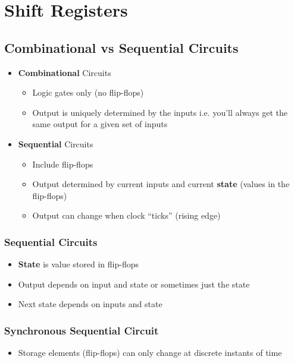 \section{Shift Registers}
\subsection{Combinational vs Sequential Circuits}
\begin{itemize}
	\item\textbf{Combinational} Circuits
	\begin{itemize}
		\item Logic gates only (no flip-flops)
		\item Output is uniquely determined by the inputs
		\subitem i.e. you'll always get the same output for a given set of inputs
	\end{itemize}
	\item\textbf{Sequential} Circuits
	\begin{itemize}
		\item Include flip-flops
		\item Output determined by current inputs and current \textbf{state} (values in the flip-flops)
		\item Output can change when clock ``ticks'' (rising edge)	
	\end{itemize}
\end{itemize}
\subsubsection{Sequential Circuits}
\begin{itemize}
	\item\textbf{State} is value stored in flip-flops
	\item Output depends on input and state
	\subitem or sometimes just the state
	\item Next state depends on inputs and state	
\end{itemize}

\subsubsection{Synchronous Sequential Circuit}
\begin{itemize}
	\item Storage elements (flip-flops) can only change at discrete instants of time	
\end{itemize}

